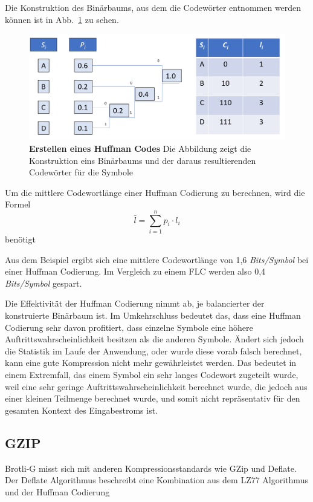 Die Konstruktion des Binärbaums, aus dem die Codewörter entnommen werden können ist in Abb.~\ref{fig:huffman_example} zu sehen.

\begin{figure}[htb]
  \centering  
  \includegraphics[scale=0.4]{Bilder/Huffmancode_beispiel.png}
  \caption[Huffman Code Beispiel]{\textbf{Erstellen eines Huffman Codes} Die Abbildung zeigt die Konstruktion eins Binärbaums und der daraus resultierenden Codewörter für die Symbole}
  \label{fig:huffman_example}
\end{figure}

Um die mittlere Codewortlänge einer Huffman Codierung zu berechnen, wird die Formel
\begin{equation*}
\bar{l} = \sum_{i=1}^{n} p_i \cdot l_i
\end{equation*}
benötigt \newline

Aus dem Beispiel ergibt sich eine mittlere Codewortlänge von 1,6 \textit{Bits/Symbol} bei einer Huffman Codierung.
Im Vergleich zu einem FLC werden also 0,4 \textit{Bits/Symbol} gespart. \newline

Die Effektivität der Huffman Codierung nimmt ab, je balancierter der konstruierte Binärbaum ist.
Im Umkehrschluss bedeutet das, dass eine Huffman Codierung sehr davon profitiert, dass einzelne Symbole eine höhere Auftrittswahrscheinlichkeit besitzen als die anderen Symbole.
Ändert sich jedoch die Statistik im Laufe der Anwendung, oder wurde diese vorab falsch berechnet, kann eine gute Kompression nicht mehr gewährleistet werden.
Das bedeutet in einem Extremfall, das einem Symbol ein sehr langes Codewort zugeteilt wurde, weil eine sehr geringe Auftrittswahrscheinlichkeit berechnet wurde, die jedoch aus einer kleinen Teilmenge berechnet wurde, und somit nicht repräsentativ für den gesamten Kontext des Eingabestroms ist.

\subsection{GZIP}
\label{subsec:gzip}
Brotli-G misst sich mit anderen Kompressionsstandards wie GZip und Deflate.
Der Deflate Algorithmus beschreibt eine Kombination aus dem LZ77 Algorithmus und der Huffman Codierung

